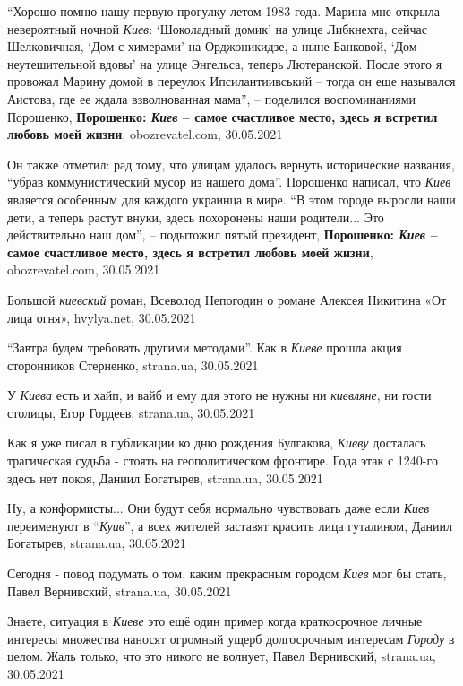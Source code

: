 \enquote{Хорошо помню нашу первую прогулку летом 1983 года. Марина мне открыла
невероятный ночной \emph{Киев}: \enquote{Шоколадный домик} на улице Либкнехта,
сейчас Шелковичная, \enquote{Дом с химерами} на Орджоникидзе, а ныне Банковой,
\enquote{Дом неутешительной вдовы} на улице Энгельса, теперь Лютеранской.
После этого я провожал Марину домой в переулок Ипсилантиивський – тогда он еще
назывался Аистова, где ее ждала взволнованная мама}, – поделился воспоминаниями
Порошенко, \textbf{Порошенко: \emph{Киев} – самое счастливое место, здесь я
встретил любовь моей жизни}, obozrevatel.com, 30.05.2021

Он также отметил: рад тому, что улицам удалось вернуть исторические названия,
\enquote{убрав коммунистический мусор из нашего дома}.  Порошенко написал, что
\emph{Киев} является особенным для каждого украинца в мире.  \enquote{В этом городе
выросли наши дети, а теперь растут внуки, здесь похоронены наши родители... Это
действительно наш дом}, – подытожил пятый президент, \textbf{Порошенко:
\emph{Киев} – самое счастливое место, здесь я встретил любовь моей жизни},
obozrevatel.com, 30.05.2021

Большой \emph{киевский} роман, Всеволод Непогодин о романе Алексея Никитина «От
лица огня», hvylya.net, 30.05.2021

\enquote{Завтра будем требовать другими методами}. Как в \emph{Киеве} прошла акция
сторонников Стерненко, strana.ua, 30.05.2021

У \emph{Киева} есть и хайп, и вайб и ему для этого не нужны ни \emph{киевляне},
ни гости столицы, Егор Гордеев, strana.ua, 30.05.2021

Как я уже писал в публикации ко дню рождения Булгакова, \emph{Киеву} досталась
трагическая судьба - стоять на геополитическом фронтире. Года этак с 1240-го
здесь нет покоя, Даниил Богатырев, strana.ua, 30.05.2021

Ну, а конформисты... Они будут себя нормально чувствовать даже если \emph{Киев}
переименуют в \enquote{\emph{Куив}}, а всех жителей заставят красить лица
гуталином, Даниил Богатырев, strana.ua, 30.05.2021

Сегодня - повод подумать о том, каким прекрасным городом \emph{Киев} мог бы
стать, Павел Вернивский, strana.ua, 30.05.2021 

Знаете, ситуация в \emph{Киеве} это ещё один пример когда краткосрочное личные
интересы множества наносят огромный ущерб долгосрочным интересам \emph{Городу}
в целом. Жаль только, что это никого не волнует, Павел Вернивский, strana.ua,
30.05.2021

